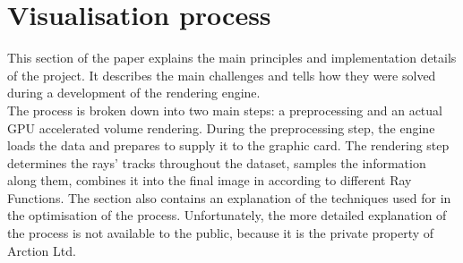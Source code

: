 \documentclass[twoside, english, 11pt]{report}
\begin{document}
\section{Visualisation process}

This section of the paper explains the main principles and implementation details of the project. It describes the main challenges and tells how they were solved during a development of the rendering engine.\\

The process is broken down into two main steps: a preprocessing and an actual GPU accelerated volume rendering. During the preprocessing step, the engine loads the data and prepares to supply it to the graphic card. The rendering step determines the rays' tracks throughout the dataset, samples the information along them, combines it into the final image in according to different Ray Functions. The section also contains an explanation of the techniques used for in the optimisation of the process. Unfortunately, the more detailed explanation of the process is not available to the public, because it is the private property of Arction Ltd.
\end{document}
